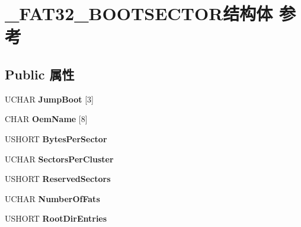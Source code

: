 \hypertarget{struct___f_a_t32___b_o_o_t_s_e_c_t_o_r}{}\section{\+\_\+\+F\+A\+T32\+\_\+\+B\+O\+O\+T\+S\+E\+C\+T\+O\+R结构体 参考}
\label{struct___f_a_t32___b_o_o_t_s_e_c_t_o_r}
\subsection*{Public 属性}
\begin{DoxyCompactItemize}
\item 
\mbox{\label{struct___f_a_t32___b_o_o_t_s_e_c_t_o_r_a87b62b10abc347a83486c42bfc6d9b6d}} 
U\+C\+H\+AR {\bfseries Jump\+Boot} \mbox{[}3\mbox{]}
\item 
\mbox{\label{struct___f_a_t32___b_o_o_t_s_e_c_t_o_r_a8d119ed49b75177a53b3bfb84a7bf3c6}} 
C\+H\+AR {\bfseries Oem\+Name} \mbox{[}8\mbox{]}
\item 
\mbox{\label{struct___f_a_t32___b_o_o_t_s_e_c_t_o_r_aba28e241a5f5b0f20f07665cd2a55a47}} 
U\+S\+H\+O\+RT {\bfseries Bytes\+Per\+Sector}
\item 
\mbox{\label{struct___f_a_t32___b_o_o_t_s_e_c_t_o_r_aee3290026512527241a3179c28298b16}} 
U\+C\+H\+AR {\bfseries Sectors\+Per\+Cluster}
\item 
\mbox{\label{struct___f_a_t32___b_o_o_t_s_e_c_t_o_r_aadcc1931d96f42091103b17c81e54fe5}} 
U\+S\+H\+O\+RT {\bfseries Reserved\+Sectors}
\item 
\mbox{\label{struct___f_a_t32___b_o_o_t_s_e_c_t_o_r_a438c543d2425c42b79a493391c351f96}} 
U\+C\+H\+AR {\bfseries Number\+Of\+Fats}
\item 
\mbox{\label{struct___f_a_t32___b_o_o_t_s_e_c_t_o_r_ab0bfeeab8515d2b5858d2ab5a36ffe90}} 
U\+S\+H\+O\+RT {\bfseries Root\+Dir\+Entries}
\item 

\end{DoxyCompactItemize}
